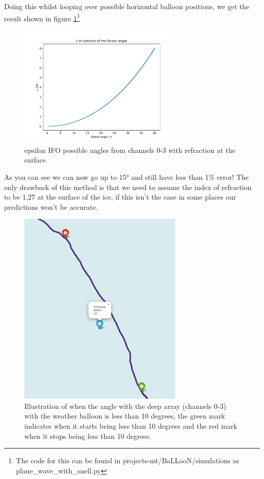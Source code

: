 \documentclass[11pt,a4paper,faculty=we,language=en,doctype=report]{cls/ugent-doc}
\begin{document}
Doing this whilst looping over possible horizontal balloon positions, we get
the result shown in figure \ref{fig:EpsilonIFODirectSnell}\footnote{The code
for this can be found in projects-mt/BaLLooN/simulations as
plane\_wave\_with\_snell.py}
\begin{figure}
	\centering
	\includegraphics[width=0.7\textwidth]{EpsilonIFODirectSnell.pdf}
	\caption{epsilon IFO possible angles from channels 0-3 with refraction at the surface}
	\label{fig:EpsilonIFODirectSnell}
\end{figure}
As you can see we can now go up to 15° and still have less than 1\% error!  The
only drawback of this method is that we need to assume the index of refraction
to be 1.27 at the surface of the ice, if this isn't the case in some places our
predictions won't be accurate.
\begin{figure}
  \centering
	\includegraphics[width=0.7\textwidth]{StartAndStop10Illu.pdf}
  \caption{Illustration of when the angle with the deep array (channels 0-3) with the weather balloon is less than 10 degrees,
  the green mark indicates when it starts being less than 10 degrees and the red mark when it stops being less than 10 degrees.}
  \label{fig:ExampleBalloonPathCrossing12LessThan10}
\end{figure}
\end{document}
